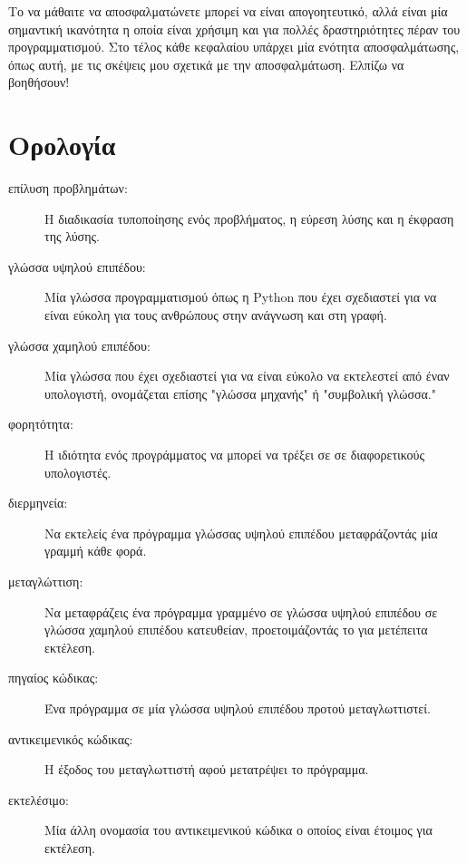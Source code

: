 \documentclass[10pt]{book}
\newcommand{\en}{\selectlanguage{english}}
\newcommand{\gr}{\selectlanguage{greek}}
\begin{document}
Το να μάθαιτε να αποσφαλματώνετε μπορεί να είναι απογοητευτικό,
αλλά είναι μία σημαντική ικανότητα η οποία είναι χρήσιμη και για
πολλές δραστηριότητες πέραν του προγραμματισμού. Στο τέλος κάθε
κεφαλαίου υπάρχει μία ενότητα αποσφαλμάτωσης, όπως αυτή, με τις
σκέψεις μου σχετικά με την αποσφαλμάτωση. Ελπίζω να βοηθήσουν!


\section{Ορολογία}

\begin{description}

\item[επίλυση προβλημάτων:]  Η διαδικασία τυποποίησης ενός προβλήματος,
	η εύρεση λύσης και η έκφραση της λύσης.

\item[γλώσσα υψηλού επιπέδου:]  Μία γλώσσα προγραμματισμού όπως η \en
	Python \gr που έχει σχεδιαστεί για να είναι εύκολη για τους ανθρώπους
	στην ανάγνωση και στη γραφή.

\item[γλώσσα χαμηλού επιπέδου:]  Μία γλώσσα που έχει σχεδιαστεί για να είναι
	εύκολο να εκτελεστεί από έναν υπολογιστή, ονομάζεται επίσης "γλώσσα μηχανής" ή
	"συμβολική γλώσσα."

\item[φορητότητα:]  Η ιδιότητα ενός προγράμματος να μπορεί να τρέξει σε
	σε διαφορετικούς υπολογιστές.

\item[διερμηνεία:]  Να εκτελείς ένα πρόγραμμα γλώσσας υψηλού επιπέδου
	μεταφράζοντάς μία γραμμή κάθε φορά.

\item[μεταγλώττιση:]  Να μεταφράζεις ένα πρόγραμμα γραμμένο σε γλώσσα
	υψηλού επιπέδου σε γλώσσα χαμηλού επιπέδου κατευθείαν, προετοιμάζοντάς το
	για μετέπειτα εκτέλεση.

\item[πηγαίος κώδικας:]  Ένα πρόγραμμα σε μία γλώσσα υψηλού επιπέδου
	προτού μεταγλωττιστεί.

\item[αντικειμενικός κώδικας:]  Η έξοδος του μεταγλωττιστή αφού μετατρέψει
	το πρόγραμμα.

\item[εκτελέσιμο:]  Μία άλλη ονομασία του αντικειμενικού κώδικα ο οποίος
	είναι έτοιμος για εκτέλεση.


\end{description}
\end{document}
